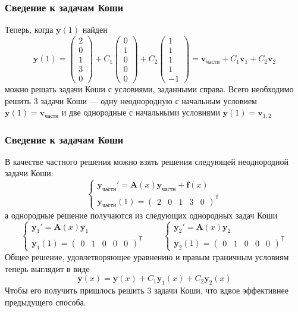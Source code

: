 \documentclass[professionalfonts,compress,unicode,aspectratio=169]{beamer}
\begin{document}
\begin{frame}\frametitle{Сведение к задачам Коши}
	Теперь, когда $\mathbf{y}(1)$ найден
	\[
	\mathbf{y}(1) = 
	\begin{pmatrix}
	2 \\ 0 \\ 1 \\ 3 \\ 0
	\end{pmatrix}
	+ C_1
	\begin{pmatrix}
	0 \\ 1 \\ 0 \\ 0 \\ 0
	\end{pmatrix}
	+ C_2
	\begin{pmatrix}
	1 \\ 1 \\ 1 \\ 1 \\ -1
	\end{pmatrix} = 
	{\mathbf{v}}_\text{частн} + 
	C_1 {\mathbf{v}}_1 + 
	C_2 {\mathbf{v}}_2 
	\]
	можно решать задачи Коши с условиями, заданными справа. Всего необходимо
	решить 3 задачи Коши --- одну неоднородную с начальным условием
	$\mathbf{y}(1)
	= \mathbf{v}_\text{частн}$ и две однородные с начальными условиями
	$\mathbf{y}(1) = \mathbf{v}_{1,2}$
\end{frame}

\begin{frame}\frametitle{Сведение к задачам Коши}

	В качестве частного решения можно взять решения следующей неоднородной
	задачи Коши:
	\[
	\begin{cases}
	\mathbf{y}_\text{частн}' = \mathbf{A}(x) \mathbf{y}_\text{частн} +
	\mathbf{f}(x)\\
	\mathbf{y}_\text{частн}(1) = \begin{pmatrix} 2 & 0 & 1 & 3 & 0\end{pmatrix}^\mathsf{T}
	\end{cases}
	\]
	а однородные решение получаются из следующих однородных задач Коши
	\[
	\begin{cases}
	\mathbf{y}_1' = \mathbf{A}(x) \mathbf{y}_1\\
	\mathbf{y}_1(1) = \begin{pmatrix} 0 & 1 & 0 & 0 & 0\end{pmatrix}^\mathsf{T}
	\end{cases}
	\qquad
	\begin{cases}
	\mathbf{y}_2' = \mathbf{A}(x) \mathbf{y}_2\\
	\mathbf{y}_2(1) = \begin{pmatrix} 0 & 1 & 0 & 0 & 0\end{pmatrix}^\mathsf{T}
	\end{cases}
	\]
	Общее решение, удовлетворяющее уравнению и правым граничным условиям теперь
	выглядит в виде
	\[
	\mathbf{y}(x) = \mathbf{y}(x) + C_1 \mathbf{y}_1(x) + C_2 \mathbf{y}_2(x)
	\]
	Чтобы его получить пришлось решить 3 задачи Коши, что вдвое эффективнее
	предыдущего способа.
\end{frame}
\end{document}
